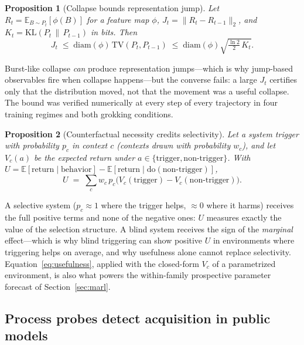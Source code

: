 \documentclass[11pt]{article}
\newtheorem{proposition}{Proposition}
\theoremstyle{definition}
\newcommand{\dO}[1]{\mathrm{do}(#1)}
\newcommand{\KL}{\mathrm{KL}}
\newcommand{\TV}{\mathrm{TV}}
\begin{document}
\begin{proposition}[Collapse bounds representation jump]\label{prop:pinsker}
Let $R_t = \mathbb{E}_{B \sim P_t}[\phi(B)]$ for a feature map $\phi$,
$J_t = \lVert R_t - R_{t-1}\rVert_2$, and
$K_t = \KL(P_t \,\|\, P_{t-1})$ in bits. Then
\begin{equation}
  J_t \;\le\; \mathrm{diam}(\phi)\, \TV(P_t, P_{t-1})
      \;\le\; \mathrm{diam}(\phi) \sqrt{\tfrac{\ln 2}{2}\, K_t }.
  \label{eq:pinsker}
\end{equation}
\end{proposition}

Burst-like collapse \emph{can} produce representation jumps---which is
why jump-based observables fire when collapse happens---but the
converse fails: a large $J_t$ certifies only that the distribution
moved, not that the movement was a useful collapse. The bound was
verified numerically at every step of every trajectory in four
training regimes and both grokking conditions.

\begin{proposition}[Counterfactual necessity credits selectivity]\label{prop:usefulness}
Let a system trigger with probability $p_c$ in context $c$ (contexts
drawn with probability $w_c$), and let $V_c(a)$ be the expected return
under $a \in \{\text{trigger}, \text{non-trigger}\}$. With
$U = \mathbb{E}[\text{return} \mid \text{behavior}] -
\mathbb{E}[\text{return} \mid \dO{\text{non-trigger}}]$,
\begin{equation}
  U \;=\; \sum_c w_c\, p_c \bigl( V_c(\text{trigger}) - V_c(\text{non-trigger}) \bigr).
  \label{eq:usefulness}
\end{equation}
\end{proposition}

A selective system ($p_c \approx 1$ where the trigger helps, $\approx
0$ where it harms) receives the full positive terms and none of the
negative ones: $U$ measures exactly the value of the selection
structure. A blind system receives the sign of the \emph{marginal}
effect---which is why blind triggering can show positive $U$ in
environments where triggering helps on average, and why usefulness
alone cannot replace selectivity. Equation~\eqref{eq:usefulness},
applied with the closed-form $V_c$ of a parametrized environment, is
also what powers the within-family prospective parameter forecast of
Section~\ref{sec:marl}.

\subsection*{Process probes detect acquisition in public models}
\label{sec:public}
\end{document}
